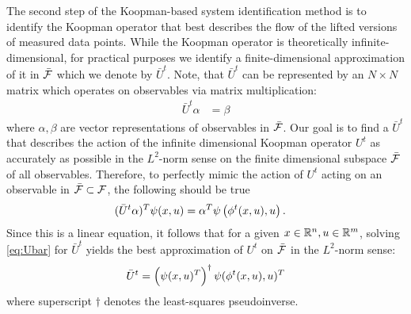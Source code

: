 The second step of the Koopman-based system identification method is to identify the Koopman operator that best describes the flow of the lifted versions of measured data points.
While the Koopman operator is theoretically infinite-dimensional, for practical purposes we identify a finite-dimensional approximation of it in $\bar{\mathcal{F}}$ which we denote by $\bar{U}^t$.
Note, that $\bar{U}^t$ can be represented by an $N \times N$ matrix which operates on observables via matrix multiplication:
\begin{align}
    \bar{U}^t {\alpha} &= {\beta} 
    \label{eq:Ubar}
\end{align}
where $\alpha, \beta$ are vector representations of observables in $\bar{\mathcal{F}}$.
Our goal is to find a $\bar{U}^t$ that describes the action of the infinite dimensional Koopman operator $U^t$ as accurately as possible in the $L^2$-norm sense on the finite dimensional subspace $\bar{\mathcal{F}}$  of all observables.
Therefore, to perfectly mimic the action of $U^t$ acting on an observable in $\bar{\mathcal{F}} \subset \mathcal{F}$, the following should be true
\begin{align}
    ( \bar{U}^t {\alpha} )^T {\psi}(x, u) &=
    {\alpha}^T {\psi} \left( \phi^t(x,u), u \right).
    \label{eq:Ubar}
\end{align}
Since this is a linear equation, it follows that for a given ${x \in \mathbb{R}^n, u \in \mathbb{R}^m}$, solving \eqref{eq:Ubar} for $\bar{U}^t$ yields the best approximation of $U^t$ on $\bar{\mathcal{F}}$ in the $L^2$-norm sense:
\begin{align}
    \bar{U}^t = \left( {\psi}(x, u)^T \right)^\dagger {\psi}( \phi^t(x,u), u )^T
    \label{eq:Uapprox}
\end{align}
where superscript $\dagger$ denotes the least-squares pseudoinverse.

